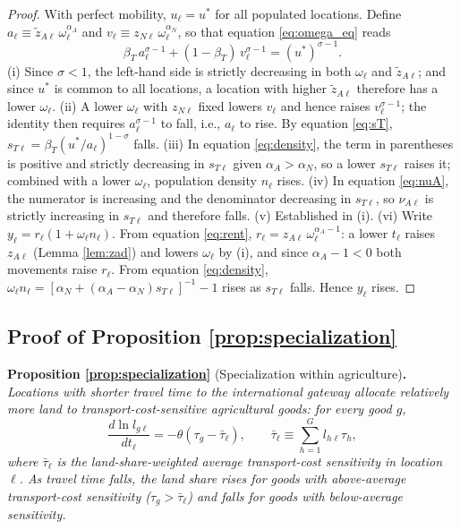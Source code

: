 \documentclass[11pt]{article}
\begin{document}
\begin{proof}
With perfect mobility, $u_\ell = u^\ast$ for all populated locations. Define $a_\ell \equiv \tilde z_{A\ell}\,\omega_\ell^{\alpha_A}$ and $v_\ell \equiv z_{N\ell}\,\omega_\ell^{\alpha_N}$, so that equation \eqref{eq:omega_eq} reads
\[
\beta_T\, a_\ell^{\sigma-1} + (1-\beta_T)\, v_\ell^{\sigma-1} = (u^\ast)^{\sigma-1}.
\]
(i) Since $\sigma<1$, the left-hand side is strictly decreasing in both $\omega_\ell$ and $\tilde z_{A\ell}$; and since $u^\ast$ is common to all locations, a location with higher $\tilde z_{A\ell}$ therefore has a lower $\omega_\ell$. (ii) A lower $\omega_\ell$ with $z_{N\ell}$ fixed lowers $v_\ell$ and hence raises $v_\ell^{\sigma-1}$; the identity then requires $a_\ell^{\sigma-1}$ to fall, i.e., $a_\ell$ to rise. By equation \eqref{eq:sT}, $s_{T\ell}=\beta_T (u^\ast/a_\ell)^{1-\sigma}$ falls. (iii) In equation \eqref{eq:density}, the term in parentheses is positive and strictly decreasing in $s_{T\ell}$ given $\alpha_A>\alpha_N$, so a lower $s_{T\ell}$ raises it; combined with a lower $\omega_\ell$, population density $n_\ell$ rises. (iv) In equation \eqref{eq:nuA}, the numerator is increasing and the denominator decreasing in $s_{T\ell}$, so $\nu_{A\ell}$ is strictly increasing in $s_{T\ell}$ and therefore falls.
(v) Established in (i). (vi) Write $y_\ell = r_\ell (1+\omega_\ell n_\ell)$. From equation \eqref{eq:rent}, $r_\ell = z_{A\ell}\,\omega_\ell^{\alpha_A-1}$: a lower $t_\ell$ raises $z_{A\ell}$ (Lemma \ref{lem:zad}) and lowers $\omega_\ell$ by (i), and since $\alpha_A-1<0$ both movements raise $r_\ell$. From equation \eqref{eq:density}, $\omega_\ell n_\ell = \left[\alpha_N+(\alpha_A-\alpha_N)s_{T\ell}\right]^{-1}-1$ rises as $s_{T\ell}$ falls. Hence $y_\ell$ rises.
\end{proof}



\subsection{Proof of Proposition \texorpdfstring{\ref{prop:specialization}}{2}}
\label{app:proof_spec}

\noindent\textbf{Proposition \ref{prop:specialization}} (Specialization within
agriculture)\textbf{.} \emph{Locations with shorter travel time to the international gateway
allocate relatively more land to transport-cost-sensitive agricultural goods: for every good
$g$,}
\[
\frac{d \ln l_{g\ell}}{d t_\ell}
= -\theta \left(\tau_g - \bar{\tau}_\ell\right),
\qquad
\bar{\tau}_\ell \equiv \sum_{h=1}^G l_{h\ell} \tau_h,
\]
\emph{where $\bar{\tau}_\ell$ is the land-share-weighted average transport-cost sensitivity in
location $\ell$. As travel time falls, the land share rises for goods with above-average
transport-cost sensitivity ($\tau_g > \bar{\tau}_\ell$) and falls for goods with below-average
sensitivity.}\medskip
\end{document}
